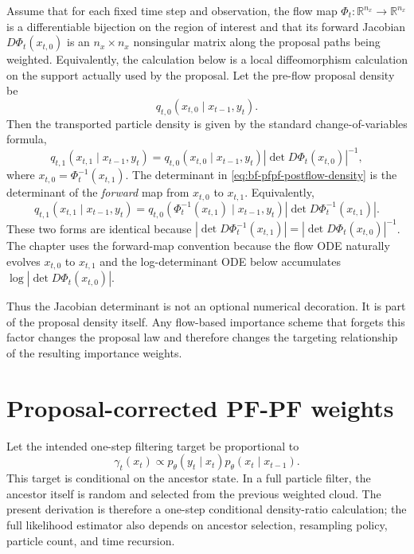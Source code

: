 Assume that for each fixed time step and observation, the flow map
$\Phi_t: \mathbb{R}^{n_x} \to \mathbb{R}^{n_x}$ is a differentiable bijection on
the region of interest and that its forward Jacobian
$D\Phi_t(x_{t,0})$ is an $n_x\times n_x$ nonsingular matrix along the proposal
paths being weighted.  Equivalently, the calculation below is a local
diffeomorphism calculation on the support actually used by the proposal.  Let
the pre-flow proposal density be
\begin{equation}
\label{eq:bf-pfpf-preflo-density}
  q_{t,0}(x_{t,0} \mid x_{t-1}, y_t).
\end{equation}
Then the transported particle density is given by the standard
change-of-variables formula,
\begin{equation}
\label{eq:bf-pfpf-postflow-density}
  q_{t,1}(x_{t,1} \mid x_{t-1}, y_t)
  = q_{t,0}(x_{t,0} \mid x_{t-1}, y_t)
    \left|\det D\Phi_t(x_{t,0})\right|^{-1},
\end{equation}
where $x_{t,0} = \Phi_t^{-1}(x_{t,1})$.
The determinant in \eqref{eq:bf-pfpf-postflow-density} is the determinant of
the \emph{forward} map from $x_{t,0}$ to $x_{t,1}$.  Equivalently,
\[
  q_{t,1}(x_{t,1}\mid x_{t-1},y_t)
  =
  q_{t,0}(\Phi_t^{-1}(x_{t,1})\mid x_{t-1},y_t)
  \left|\det D\Phi_t^{-1}(x_{t,1})\right|.
\]
These two forms are identical because
$|\det D\Phi_t^{-1}(x_{t,1})|
=|\det D\Phi_t(x_{t,0})|^{-1}$.  The chapter uses the forward-map convention
because the flow ODE naturally evolves $x_{t,0}$ to $x_{t,1}$ and the
log-determinant ODE below accumulates $\log|\det D\Phi_t(x_{t,0})|$.

Thus the Jacobian determinant is not an optional numerical decoration.  It is
part of the proposal density itself.  Any flow-based importance scheme that
forgets this factor changes the proposal law and therefore changes the targeting
relationship of the resulting importance weights.

\section{Proposal-corrected PF-PF weights}
\label{sec:bf-pfpf-corrected-weights}

Let the intended one-step filtering target be proportional to
\begin{equation}
\label{eq:bf-pfpf-target-density}
  \gamma_t(x_t)
  \propto p_\theta(y_t \mid x_t)
          p_\theta(x_t \mid x_{t-1}).
\end{equation}
This target is conditional on the ancestor state.  In a full particle filter,
the ancestor itself is random and selected from the previous weighted cloud.
The present derivation is therefore a one-step conditional density-ratio
calculation; the full likelihood estimator also depends on ancestor selection,
resampling policy, particle count, and time recursion.

